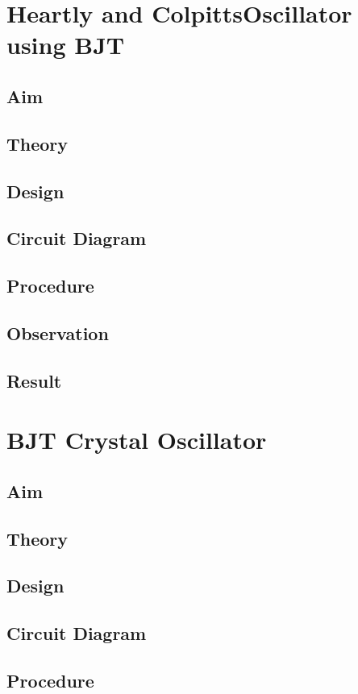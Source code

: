 \documentclass{book}
\begin{document}
\chapter[Heartly and Colpitts Oscillator using BJT] {Heartly and ColpittsOscillator using BJT}
\section*{Aim}
\section*{Theory}
\section*{Design}
\section*{Circuit Diagram}
\section*{Procedure}
\section*{Observation}
\section*{Result}
\chapter[BJT Crystal Oscillator]{BJT Crystal Oscillator}
\section*{Aim}
\section*{Theory}
\section*{Design}
\section*{Circuit Diagram}
\section*{Procedure}
\end{document}
